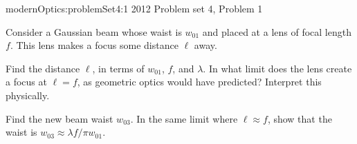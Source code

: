 {modernOptics:problemSet4:1}
{2012 Problem set 4, Problem 1}
{


Consider a Gaussian beam whose waist is $w_{01}$ and placed at a lens of focal length $f$. This lens makes a focus some distance $\ell$ away.

Find the distance $\ell$, in terms of $w_{01}$, $f$, and $\lambda$. In what limit does the lens create a focus at $\ell = f$, as geometric optics would have predicted? Interpret this physically.

Find the new beam waist $w_{03}$. In the same limit where $\ell \approx f$, show that the waist is $w_{03} \approx {\lambda f}/{\pi w_{01}}.$
} %

